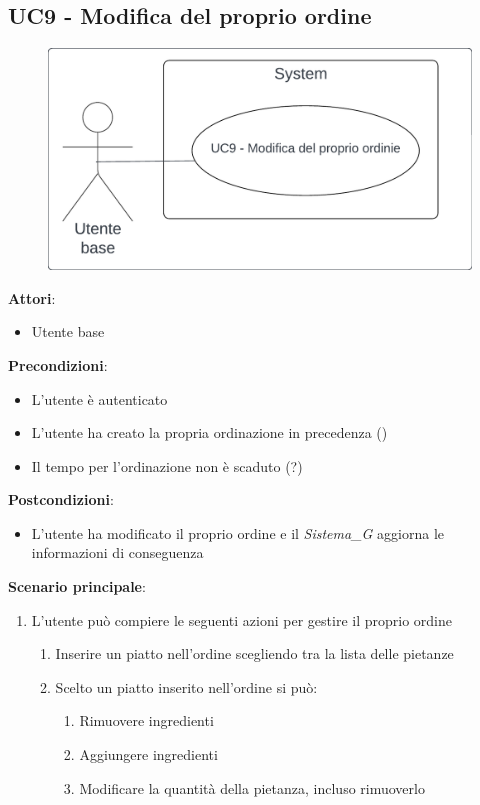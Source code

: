 \subsection{UC9 - Modifica del proprio ordine}\label{usecase:9}
\begin{figure}[H]
    \centering
    \includegraphics[width=0.9\linewidth]{ucd/ucd9.png}
\end{figure}
\textbf{Attori}:
\begin{itemize}
    \item Utente base
\end{itemize}
\textbf{Precondizioni}:
\begin{itemize}
    \item L'utente è autenticato
    \item L'utente ha creato la propria ordinazione in precedenza ()
    \item Il tempo per l'ordinazione non è scaduto (?)
\end{itemize}
\textbf{Postcondizioni}:
\begin{itemize}
    \item L'utente ha modificato il proprio ordine e il \textit{Sistema_G} aggiorna le informazioni di conseguenza
\end{itemize}
\textbf{Scenario principale}:
\begin{enumerate}
    \item L'utente può compiere le seguenti azioni per gestire il proprio ordine
    \begin{enumerate}
        \item Inserire un piatto nell'ordine scegliendo tra la lista delle pietanze
        \item Scelto un piatto inserito nell'ordine si può:
        \begin{enumerate}
            \item Rimuovere ingredienti
            \item Aggiungere ingredienti
            \item Modificare la quantità della pietanza, incluso rimuoverlo
        \end{enumerate}
    \end{enumerate}
\end{enumerate}

\newpage